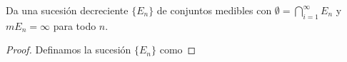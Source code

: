 \documentclass[12pt]{article}
\newenvironment{problem}[2][Problema]{\begin{trivlist}
\item[\hskip \labelsep {\bfseries #1}\hskip \labelsep {\bfseries #2.}]}{\end{trivlist}}
\begin{document}
\begin{problem}{7} Da una sucesión decreciente $\{E_n \}$ de conjuntos medibles con $\emptyset  = \bigcap_{i=1}^\infty E_n $ y $m E_n = \infty $ para todo $n$.     
\end{problem}
\begin{proof}
Definamos la sucesión $\{ E_n \}$ como 
    
\end{proof}
\end{document}
